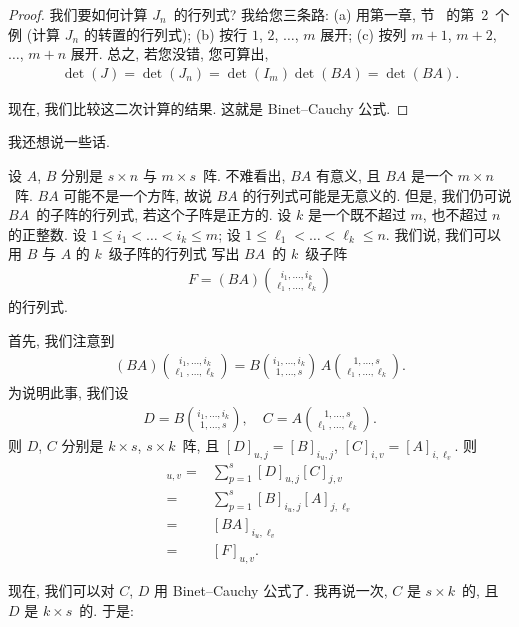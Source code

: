 \begin{proof}
    我们要如何计算 \(J_n\)~的行列式?
    我给您三条路:
    (a)
    用第一章, 节~ 的第~2~个例
    (计算 \(J_n\) 的转置的行列式);
    (b)
    按行 \(1\), \(2\), \(\dots\), \(m\) 展开;
    (c)
    按列 \(m+1\), \(m+2\), \(\dots\), \(m+n\) 展开.
    总之, 若您没错, 您可算出,
    \begin{align*}
        \det {(J)}
        = \det {(J_n)}
        = \det {(I_m)} \det {(BA)}
        = \det {(BA)}.
    \end{align*}

    现在, 我们比较这二次计算的结果.
    这就是 Binet--Cauchy 公式.
\end{proof}

我还想说一些话.

设 \(A\), \(B\) 分别是 \(s \times n\) 与 \(m \times s\)~阵.
不难看出, \(BA\) 有意义, 且 \(BA\) 是一个 \(m \times n\)~阵.
\(BA\) 可能不是一个方阵, 故说 \(BA\) 的行列式可能是无意义的.
但是, 我们仍可说 \(BA\)~的子阵的行列式, 若这个子阵是正方的.
设 \(k\) 是一个既不超过 \(m\), 也不超过 \(n\) 的正整数.
设 \(1 \leq i_1 < \dots < i_k \leq m\);
设 \(1 \leq \ell_1 < \dots < \ell_k \leq n\).
我们说, 我们可以用 \(B\) 与 \(A\) 的 \(k\)~级子阵的行列式%
写出 \(BA\)~的 \(k\)~级子阵
\begin{align*}
    F = (BA)\binom{i_1,\dots,i_k}{\ell_1,\dots,\ell_k}
\end{align*}
的行列式.

首先, 我们注意到
\begin{align*}
    (BA)\binom{i_1,\dots,i_k}{\ell_1,\dots,\ell_k}
    =
    B\binom{i_1,\dots,i_k}{1,\dots,s}
    \,
    A\binom{1,\dots,s}{\ell_1,\dots,\ell_k}.
\end{align*}
为说明此事, 我们设
\begin{align*}
    D = B\binom{i_1,\dots,i_k}{1,\dots,s},
    \quad
    C = A\binom{1,\dots,s}{\ell_1,\dots,\ell_k}.
\end{align*}
则 \(D\), \(C\) 分别是 \(k \times s\), \(s \times k\)~阵,
且 \([D]_{u,j} = [B]_{i_u,j}\),
\([C]_{i,v} = [A]_{i,\ell_v}\).
则
\begin{align*}
    [DC]_{u,v}
    = {} &
    \sum_{p = 1}^{s} {[D]_{u,j} [C]_{j,v}}
    \\
    = {} &
    \sum_{p = 1}^{s} {[B]_{i_u,j} [A]_{j,\ell_v}}
    \\
    = {} &
    [BA]_{i_u,\ell_v}
    \\
    = {} &
    [F]_{u,v}.
\end{align*}

现在, 我们可以对 \(C\), \(D\) 用 Binet--Cauchy 公式了.
我再说一次, \(C\) 是 \(s \times k\)~的,
且 \(D\) 是 \(k \times s\)~的.
于是:


